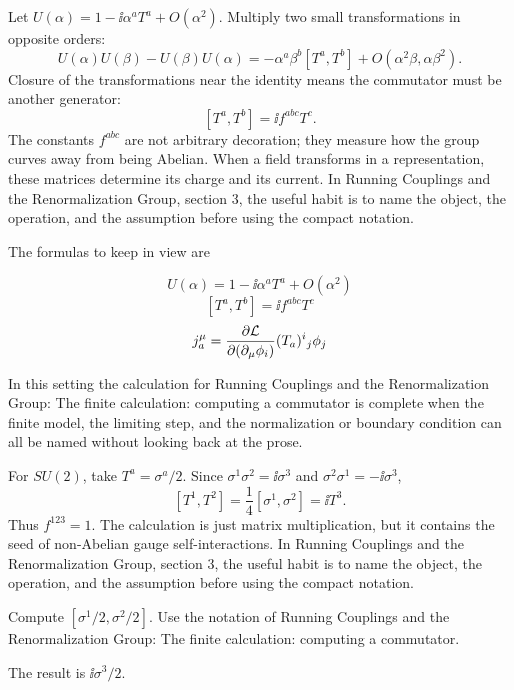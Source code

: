 Let \(U(\alpha)=1-\ii\alpha^aT^a+O(\alpha^2)\).  Multiply two small transformations in opposite orders:
\[
  U(\alpha)U(\beta)-U(\beta)U(\alpha)
  =
  -\alpha^a\beta^b[T^a,T^b]+O(\alpha^2\beta,\alpha\beta^2).
\]
Closure of the transformations near the identity means the commutator must be another generator:
\[
  [T^a,T^b]=\ii f^{abc}T^c.
\]
The constants \(f^{abc}\) are not arbitrary decoration; they measure how the group curves away from being Abelian.  When a field transforms in a representation, these matrices determine its charge and its current.  In Running Couplings and the Renormalization Group, section 3, the useful habit is to name the object, the operation, and the assumption before using the compact notation.

The formulas to keep in view are

\[
  U(\alpha)=1-\ii\alpha^aT^a+O(\alpha^2)
\]
\[
  [T^a,T^b]=\ii f^{abc}T^c
\]
\[
  j^\mu_a=\frac{\partial\mathcal L}{\partial(\partial_\mu\phi_i)}(T_a)^i{}_j\phi_j
\]

In this setting the calculation for Running Couplings and the Renormalization Group: The finite calculation: computing a commutator is complete when the finite model, the limiting step, and the normalization or boundary condition can all be named without looking back at the prose.




\begin{example}
For \(SU(2)\), take \(T^a=\sigma^a/2\).  Since \(\sigma^1\sigma^2=\ii\sigma^3\) and \(\sigma^2\sigma^1=-\ii\sigma^3\),
\[
  [T^1,T^2]=\frac14[\sigma^1,\sigma^2]=\ii T^3.
\]
Thus \(f^{123}=1\).  The calculation is just matrix multiplication, but it contains the seed of non-Abelian gauge self-interactions.  In Running Couplings and the Renormalization Group, section 3, the useful habit is to name the object, the operation, and the assumption before using the compact notation.
\end{example}



\begin{exercise}
Compute \([\sigma^1/2,\sigma^2/2]\).  Use the notation of Running Couplings and the Renormalization Group: The finite calculation: computing a commutator.
\begin{answer}
The result is \(\ii\sigma^3/2\).
\end{answer}
\end{exercise}

